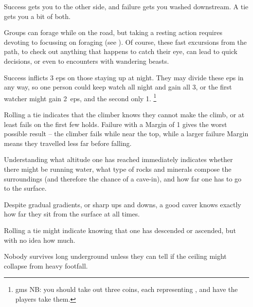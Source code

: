 \begin{multicols}{2}
Success gets you to the other side, and failure gets you washed downstream.
A tie gets you a bit of both.


Groups can forage while on the road, but taking a resting action requires devoting  to focussing on foraging (see ).
Of course, these fast excursions from the path, to check out anything that happens to catch their eye, can lead to quick decisions, or even to encounters with wandering beasts.

\gatheringChart

Success inflicts 3 \glspl{ep} on those staying up at night.
They may divide these \glspl{ep} in any way, so one person could keep watch all night and gain all 3, or the first watcher might gain 2~\glspl{ep}, and the second only 1.%
\footnote{\Glspl{gm} NB: you should take out three coins, each representing , and have the players take them.}


Rolling a tie indicates that the climber knows they cannot make the climb, or at least fails on the first few holds.
Failure with a Margin of 1 gives the worst possible result -- the climber fails while near the top, while a larger failure Margin means they travelled less far before falling.

Understanding what altitude one has reached immediately indicates whether there might be running water, what type of rocks and minerals compose the surroundings (and therefore the chance of a cave-in), and how far one has to go to the surface.

Despite gradual gradients, or sharp ups and downs, a good caver knows exactly how far they sit from the surface at all times.

Rolling a tie might indicate knowing that one has descended or ascended, but with no idea how much.

Nobody survives long underground unless they can tell if the ceiling might collapse from heavy footfall.


\end{multicols}
